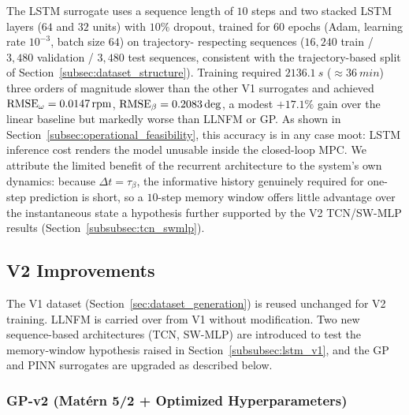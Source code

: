 The LSTM \citep{hochreiter_lstm_1997} surrogate uses a sequence length of $10$ steps and two stacked
LSTM layers ($64$ and $32$ units) with $10\%$ dropout, trained for $60$
epochs (Adam, learning rate $10^{-3}$, batch size $64$) on trajectory-
respecting sequences ($16{,}240$ train / $3{,}480$ validation / $3{,}480$
test sequences, consistent with the trajectory-based split of
Section~\ref{subsec:dataset_structure}). Training required $\SI{2136.1}{s}$
($\approx\SI{36}{min}$)  three orders of magnitude slower than the other
V1 surrogates  and achieved $\text{RMSE}_{\omega}=\SI{0.0147}{rpm}$,
$\text{RMSE}_{\beta}=0.2083\deg$, a modest $+17.1\%$ gain over the linear
baseline but markedly worse than LLNFM or GP. As shown in
Section~\ref{subsec:operational_feasibility}, this accuracy is in any case
moot: LSTM inference cost renders the model unusable inside the closed-loop
MPC. We attribute the limited benefit of the recurrent architecture to the
system's own dynamics: because $\Delta t = \tau_\beta$, the informative
history genuinely required for one-step prediction is short, so a
$10$-step memory window offers little advantage over the instantaneous
state  a hypothesis further supported by the V2 TCN/SW-MLP results
(Section~\ref{subsubsec:tcn_swmlp}).

\subsection{V2 Improvements}
\label{subsec:v2_models}

The V1 dataset (Section~\ref{sec:dataset_generation}) is reused unchanged
for V2 training. LLNFM is carried over from V1 without modification. Two
new sequence-based architectures (TCN, SW-MLP) are introduced to test the
memory-window hypothesis raised in Section~\ref{subsubsec:lstm_v1}, and the
GP and PINN surrogates are upgraded as described below.

\subsubsection{GP-v2 (Matérn 5/2 + Optimized Hyperparameters)}
\label{subsubsec:gp_v2}

